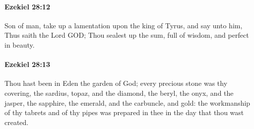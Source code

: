 		\paragraph{Ezekiel 28:12} %
			\label{EZEKIEL-28-12}

			Son of man, take up a lamentation upon the king of Tyrus, and say unto him, Thus saith the Lord GOD; Thou sealest up the sum, full of wisdom, and perfect in beauty.


		\paragraph{Ezekiel 28:13} %
			\label{EZEKIEL-28-13}

			Thou hast been in Eden the garden of God; every precious stone was thy covering, the sardius, topaz, and the diamond, the beryl, the onyx, and the jasper, the sapphire, the emerald, and the carbuncle, and gold: the workmanship of thy tabrets and of thy pipes was prepared in thee in the day that thou wast created.

